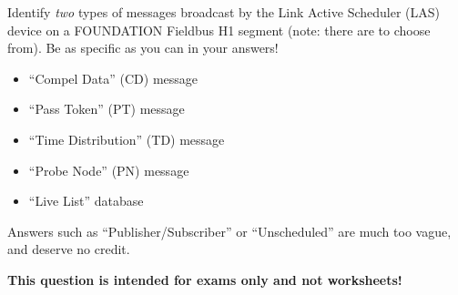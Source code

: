

Identify {\it two} types of messages broadcast by the Link Active Scheduler (LAS) device on a FOUNDATION Fieldbus H1 segment (note: there are  to choose from).  Be as specific as you can in your answers!

\vskip 100pt







\begin{itemize}
\item{} ``Compel Data'' (CD) message
\item{} ``Pass Token'' (PT) message
\item{} ``Time Distribution'' (TD) message
\item{} ``Probe Node'' (PN) message
\item{} ``Live List'' database
\end{itemize}

Answers such as ``Publisher/Subscriber'' or ``Unscheduled'' are much too vague, and deserve no credit.







{\bf This question is intended for exams only and not worksheets!}



